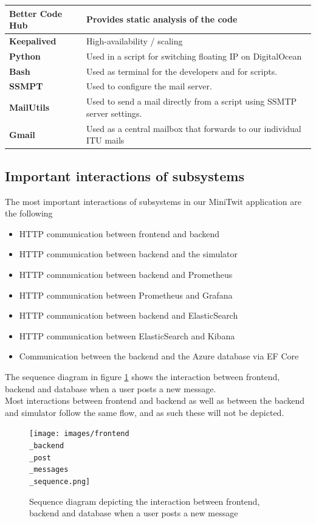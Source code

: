 \begin{tabularx}{\textwidth}{|X|l|}
 \hline
 \textbf{Better Code Hub} & Provides static analysis of the code \\
 \hline
 \textbf{Keepalived} & High-availability / scaling \\
 \hline
 \textbf{Python} & Used in a script for switching floating IP on DigitalOcean  \\
 \hline
 \textbf{Bash} & Used as terminal for the developers and for scripts.\\
 \hline
 \textbf{SSMPT} & Used to configure the mail server.\\
 \hline
 \textbf{MailUtils} & Used to send a mail directly from a script using SSMTP server settings. \\
 \hline
 \textbf{Gmail} & Used as a central mailbox that forwards to our individual ITU mails \\[1ex] 
 \hline
\end{tabularx}

\subsection{Important interactions of subsystems}
The most important interactions of subsystems in our MiniTwit application are the following 
\begin{itemize}
    \item HTTP communication between frontend and backend
    \item HTTP communication between backend and the simulator
    \item HTTP communication between backend and Prometheus
    \item HTTP communication between Prometheus and Grafana
    \item HTTP communication between backend and ElasticSearch
    \item HTTP communication between ElasticSearch and Kibana
    \item Communication between the backend and the Azure database via EF Core
\end{itemize}

The sequence diagram in figure \ref{fig:SequenceDiagramPostMessage} shows the interaction between frontend, backend and database when a user posts a new message. \\
Most interactions between frontend and backend as well as between the backend and simulator follow the same flow, and as such these will not be depicted.

\begin{figure}[H]
 \centering
 \texttt{[image: images/frontend\\\_backend\\\_post\\\_messages\\\_sequence.png]}
 \caption{Sequence diagram depicting the interaction between frontend, backend and database when a user posts a new message}
 \label{fig:SequenceDiagramPostMessage}
\end{figure}

